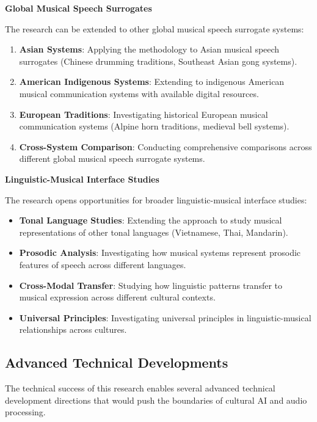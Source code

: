 \documentclass[12pt,a4paper]{article}
\begin{document}
\textbf{Global Musical Speech Surrogates}

The research can be extended to other global musical speech surrogate systems:

\begin{enumerate}
\item \textbf{Asian Systems}: Applying the methodology to Asian musical speech surrogates (Chinese drumming traditions, Southeast Asian gong systems).
\item \textbf{American Indigenous Systems}: Extending to indigenous American musical communication systems with available digital resources.
\item \textbf{European Traditions}: Investigating historical European musical communication systems (Alpine horn traditions, medieval bell systems).
\item \textbf{Cross-System Comparison}: Conducting comprehensive comparisons across different global musical speech surrogate systems.
\end{enumerate}

\textbf{Linguistic-Musical Interface Studies}

The research opens opportunities for broader linguistic-musical interface studies:

\begin{itemize}
\item \textbf{Tonal Language Studies}: Extending the approach to study musical representations of other tonal languages (Vietnamese, Thai, Mandarin).
\item \textbf{Prosodic Analysis}: Investigating how musical systems represent prosodic features of speech across different languages.
\item \textbf{Cross-Modal Transfer}: Studying how linguistic patterns transfer to musical expression across different cultural contexts.
\item \textbf{Universal Principles}: Investigating universal principles in linguistic-musical relationships across cultures.
\end{itemize}

\subsection{Advanced Technical Developments}

The technical success of this research enables several advanced technical development directions that would push the boundaries of cultural AI and audio processing.
\end{document}

